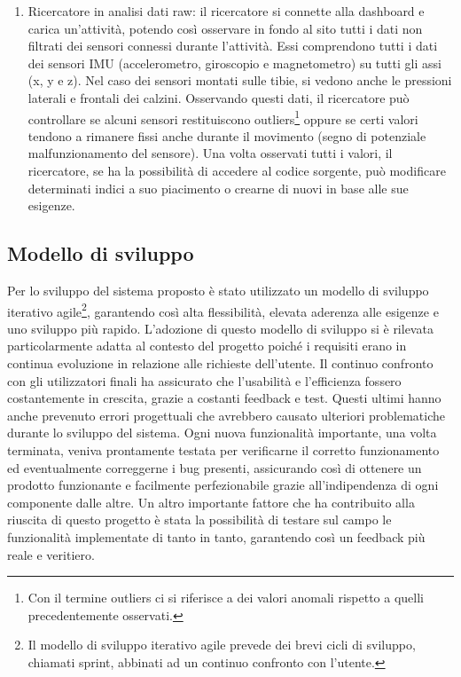 \documentclass[target=bach,aauheader=,style=]{thud}
\begin{document}
\begin{enumerate}
    \item Ricercatore in analisi dati raw: il ricercatore si connette alla dashboard e carica un'attività, potendo così osservare in fondo al sito tutti i dati non filtrati dei sensori connessi durante l'attività. Essi comprendono tutti i dati dei sensori IMU (accelerometro, giroscopio e magnetometro) su tutti gli assi (x, y e z). Nel caso dei sensori montati sulle tibie, si vedono anche le pressioni laterali e frontali dei calzini. Osservando questi dati, il ricercatore può controllare se alcuni sensori restituiscono outliers\footnote{Con il termine outliers ci si riferisce a dei valori anomali rispetto a quelli precedentemente osservati.} oppure se certi valori tendono a rimanere fissi anche durante il movimento (segno di potenziale malfunzionamento del sensore). Una volta osservati tutti i valori, il ricercatore, se ha la possibilità di accedere al codice sorgente, può modificare determinati indici a suo piacimento o crearne di nuovi in base alle sue esigenze.
\end{enumerate}

\subsection{Modello di sviluppo}
Per lo sviluppo del sistema proposto è stato utilizzato un modello di sviluppo iterativo agile\footnote{Il modello di sviluppo iterativo agile prevede dei brevi cicli di sviluppo, chiamati sprint, abbinati ad un continuo confronto con l'utente.}, garantendo così alta flessibilità, elevata aderenza alle esigenze e uno sviluppo più rapido. L'adozione di questo modello di sviluppo si è rilevata particolarmente adatta al contesto del progetto poiché i requisiti erano in continua evoluzione in relazione alle richieste dell'utente. Il continuo confronto con gli utilizzatori finali ha assicurato che l'usabilità e l'efficienza fossero costantemente in crescita, grazie a costanti feedback e test. Questi ultimi hanno anche prevenuto errori progettuali che avrebbero causato ulteriori problematiche durante lo sviluppo del sistema. Ogni nuova funzionalità importante, una volta terminata, veniva prontamente testata per verificarne il corretto funzionamento ed eventualmente correggerne i bug presenti, assicurando così di ottenere un prodotto funzionante e facilmente perfezionabile grazie all'indipendenza di ogni componente dalle altre. Un altro importante fattore che ha contribuito alla riuscita di questo progetto è stata la possibilità di testare sul campo le funzionalità implementate di tanto in tanto, garantendo così un feedback più reale e veritiero.
\end{document}
